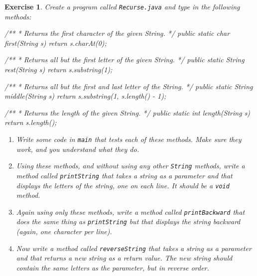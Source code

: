 \documentclass[12pt]{book}
\theoremstyle{exercise}
\newtheorem{exercise}{Exercise}[chapter]
\newcommand{\java}[1]{\verb"#1"}
\begin{document}
\begin{exercise}

Create a program called {\tt Recurse.java} and type in the following methods:

\begin{code}
    /**
     * Returns the first character of the given String.
     */
    public static char first(String s) {
        return s.charAt(0);
    }
\end{code}

\begin{code}
    /**
     * Returns all but the first letter of the given String.
     */
    public static String rest(String s) {
        return s.substring(1);
    }
\end{code}

\begin{code}
    /**
     * Returns all but the first and last letter of the String.
     */
    public static String middle(String s) {
        return s.substring(1, s.length() - 1);
    }
\end{code}

\begin{code}
    /**
     * Returns the length of the given String.
     */
    public static int length(String s) {
        return s.length();
    }
\end{code}

\begin{enumerate}

\item Write some code in \java{main} that tests each of these methods.
Make sure they work, and you understand what they do.

\item Using these methods, and without using any other \java{String} methods, write a method called \java{printString} that takes a string as a parameter and that displays the letters of the string, one on each line.
It should be a \java{void} method.

\item Again using only these methods, write a method called \java{printBackward} that does the same thing as \java{printString} but that displays the string backward (again, one character per line).

\item Now write a method called \java{reverseString} that takes a string as a parameter and that returns a new string as a return value.
The new string should contain the same letters as the parameter, but in reverse order.


\end{enumerate}
\end{exercise}
\end{document}

